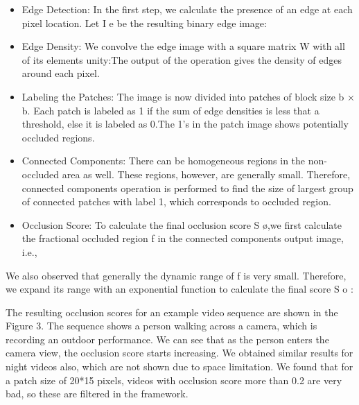 \documentclass{sig-alternate}
\begin{document}
\begin{itemize}
    \item Edge Detection: In the first step, we calculate the presence of an edge at each pixel location. Let I e be the resulting binary edge image:
    
    \item Edge Density: We convolve the edge image with a square matrix W with all of its elements unity:The output of the operation gives the density of edges around each pixel.
    
    \item Labeling the Patches: The image is now divided into patches of block size b × b. Each patch is labeled as 1 if the sum of edge densities is less that a threshold, else it is labeled as 0.The 1’s in the patch image shows potentially occluded regions.
    
    \item Connected Components: There can be homogeneous regions in the non-occluded area as well. These regions, however, are generally small. Therefore, connected components operation is performed to find the size of largest group of connected patches with label 1, which corresponds to occluded region.
    
    \item Occlusion Score: To calculate the final occlusion score S \o ,we first calculate the fractional occluded region f in the connected components output image, i.e.,
\end{itemize}
We also observed that generally the dynamic range of f is very small. Therefore, we expand its range with an exponential function to calculate the final score S o :

The resulting occlusion scores for an example video sequence are shown in the Figure 3. The sequence shows a person walking across a camera, which is recording an outdoor performance. We can see that as the person enters the camera view, the occlusion score starts increasing. We obtained similar results for night videos also, which are not shown due to space limitation. We found that for a patch size of 20*15 pixels, videos with occlusion score more than 0.2 are very bad, so these are filtered in the framework.
\end{document}

